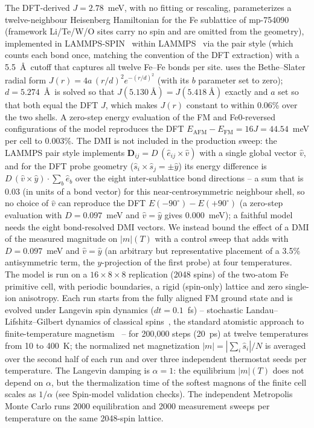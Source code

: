 \documentclass[aps,prb,preprint,superscriptaddress,longbibliography,nofootinbib]{revtex4-2}
\begin{document}
The DFT-derived $J=2.78$~meV, with no fitting or rescaling, parameterizes a twelve-neighbour Heisenberg
Hamiltonian for the Fe sublattice of mp-754090 (framework Li/Te/W/O sites carry no spin and are omitted from
the geometry), implemented in LAMMPS-SPIN~\cite{tranchida2018} within
LAMMPS~\cite{plimpton1995,thompson2022} via the  pair style (which counts each bond once,
matching the convention of the DFT extraction) with a 5.5~\AA\ cutoff that captures all twelve Fe--Fe bonds
per site.  uses the Bethe--Slater radial form $J(r)=4a\,(r/d)^2 e^{-(r/d)^2}$ (with its
$b$ parameter set to zero); $d=5.274$~\AA\ is solved so that $J(5.130~\text{\AA})=J(5.418~\text{\AA})$
exactly and $a$ set so that both equal the DFT $J$, which makes $J(r)$ constant to within 0.06\% over the two
shells. A zero-step energy evaluation of the FM and Fe0-reversed configurations of the model reproduces the
DFT $E_\mathrm{AFM}-E_\mathrm{FM}=16J=44.54$~meV per cell to 0.003\%. The DMI is not included in the production
sweep: the LAMMPS  pair style implements $\mathbf{D}_{ij} = D\,(\hat{e}_{ij}\times\hat{v})$
with a single global vector $\hat{v}$, and for the DFT probe geometry ($\hat{s}_i\times\hat{s}_j=\pm\hat{y}$)
its energy difference is $D\,(\hat{v}\times\hat{y})\cdot\sum_b\hat{e}_b$ over the eight inter-sublattice bond
directions -- a sum that is 0.03 (in units of a bond vector) for this near-centrosymmetric neighbour shell, so
no choice of $\hat{v}$ can reproduce the DFT $E(-90^\circ)-E(+90^\circ)$ (a zero-step evaluation with
$D=0.097$~meV and $\hat{v}=\hat{y}$ gives $0.000$~meV); a faithful model needs the eight bond-resolved DMI
vectors. We instead bound the effect of a DMI of the measured magnitude on $|m|(T)$ with a control sweep that
adds  with $D=0.097$~meV and $\hat{v}=\hat{y}$ (an arbitrary but representative placement of
a 3.5\% antisymmetric term, the $y$-projection of the first probe) at four temperatures. The model is run on a $16\times8\times8$ replication (2048
spins) of the two-atom Fe primitive cell, with periodic boundaries, a rigid (spin-only) lattice and zero
single-ion anisotropy. Each run starts from the fully aligned FM ground state and is evolved under Langevin
spin dynamics ($dt=0.1$~fs) -- stochastic Landau--Lifshitz--Gilbert dynamics of classical
spins~\cite{gilbert2004,ma2011}, the standard atomistic approach to finite-temperature
magnetism~\cite{skubic2008,evans2014} -- for 200{,}000 steps (20~ps) at twelve temperatures from 10 to 400~K;
the normalized net magnetization $|m|=|\sum_i\hat{s}_i|/N$ is averaged over the second half of each run and
over three independent thermostat seeds per temperature. The Langevin damping is $\alpha=1$: the equilibrium
$|m|(T)$ does not depend on $\alpha$, but the thermalization time of the softest magnons of the finite cell
scales as $1/\alpha$ (see Spin-model validation checks). The independent Metropolis Monte Carlo
runs 2000 equilibration and 2000 measurement sweeps per
temperature on the same 2048-spin lattice.
\end{document}
